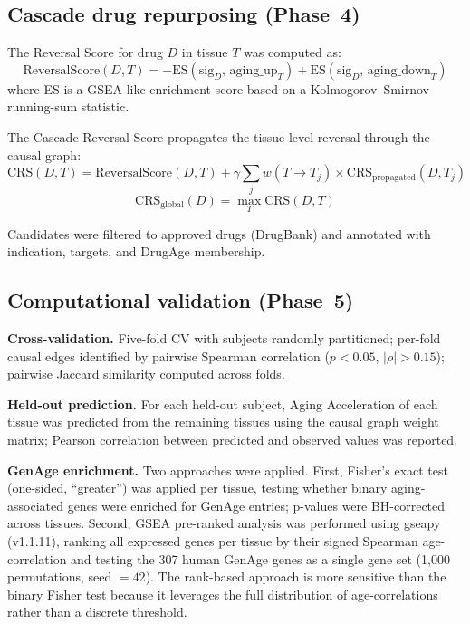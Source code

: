 \documentclass[11pt,a4paper]{article}
\begin{document}
\subsection*{Cascade drug repurposing (Phase~4)}

The Reversal Score for drug $D$ in tissue $T$ was computed as:
\begin{equation}
\text{ReversalScore}(D, T) = -\text{ES}(\text{sig}_D,\, \text{aging\_up}_T) + \text{ES}(\text{sig}_D,\, \text{aging\_down}_T)
\label{eq:reversal}
\end{equation}
where ES is a GSEA-like enrichment score based on a Kolmogorov--Smirnov running-sum statistic.

The Cascade Reversal Score propagates the tissue-level reversal through the causal graph:
\begin{equation}
\text{CRS}(D, T) = \text{ReversalScore}(D, T) + \gamma \sum_j w(T \to T_j) \times \text{CRS}_{\text{propagated}}(D, T_j)
\label{eq:crs}
\end{equation}
\begin{equation}
\text{CRS}_{\text{global}}(D) = \max_T \text{CRS}(D, T)
\label{eq:crs_global}
\end{equation}

Candidates were filtered to approved drugs (DrugBank) and annotated with indication, targets, and DrugAge membership.

\subsection*{Computational validation (Phase~5)}

\textbf{Cross-validation.} Five-fold CV with subjects randomly partitioned; per-fold causal edges identified by pairwise Spearman correlation ($p < 0.05$, $|\rho| > 0.15$); pairwise Jaccard similarity computed across folds.

\textbf{Held-out prediction.} For each held-out subject, Aging Acceleration of each tissue was predicted from the remaining tissues using the causal graph weight matrix; Pearson correlation between predicted and observed values was reported.

\textbf{GenAge enrichment.} Two approaches were applied. First, Fisher's exact test (one-sided, ``greater'') was applied per tissue, testing whether binary aging-associated genes were enriched for GenAge entries; p-values were BH-corrected across tissues. Second, GSEA pre-ranked analysis was performed using gseapy (v1.1.11), ranking all expressed genes per tissue by their signed Spearman age-correlation and testing the 307 human GenAge genes as a single gene set (1,000 permutations, seed $= 42$). The rank-based approach is more sensitive than the binary Fisher test because it leverages the full distribution of age-correlations rather than a discrete threshold.
\end{document}
